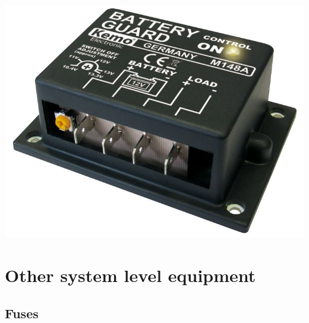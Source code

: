 \documentclass{article}
\theoremstyle{definition}
\theoremstyle{definition}
\theoremstyle{remark}
\begin{document}
  \begin{center}
    \includegraphics[width=0.15\paperwidth]{../Images/image_7_1_(discharge_control).png}
  \end{center}


{\color{blue}\section{Other system level equipment}} %
\label{sec:other_system_level_equipment}

  {\color{blue}\subsection{Fuses}} %
  \label{sub:fuses}
\end{document}
